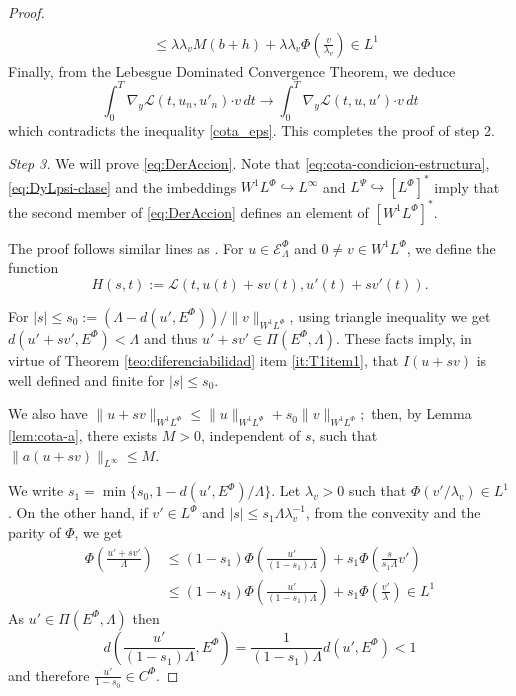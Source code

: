 \documentclass[twoside]{article}
\theoremstyle{remark}
\newcommand{\linf}{\|_{L^{\infty}}}
\newcommand{\lphi}{L^{\Phi}}
\newcommand{\lpsi}{L^{\Psi}}
\newcommand{\ephi}{E^{\Phi}}
\newcommand{\wphi}{W^{1}\lphi}
\newcommand{\sobnor}{\|_{W^{1}\lphi}}
\newcommand{\domi}{\mathcal{E}^{\Phi}}
\renewcommand{\b}[1]{\boldsymbol{#1}}
\newcommand{\ccdot}{\b{\cdot}}
\renewcommand{\leq}{\leqslant}
\begin{document}
\begin{proof}
\begin{equation}
\begin{split}
\\
&\leq \lambda\lambda_v M (b+h)+\lambda\lambda_v  \Phi\left(\frac{v}{\lambda_v}\right)\in L^1
\end{split}
\end{equation}
  Finally, from the Lebesgue Dominated Convergence Theorem, we deduce
\begin{equation}\label{conv_debil}
\int_0^T  \nabla_y\mathcal{L}(t,u_{n},u'_{n})
\ccdot  v \,dt 
\to 
\int_0^T \nabla_y\mathcal{L}(t,u,u')\ccdot v\, dt \end{equation}
which contradicts the inequality \eqref{cota_eps}. This completes the proof of step 2.

\emph{Step 3.} We will prove \eqref{eq:DerAccion}. 
 Note that \eqref{eq:cota-condicion-estructura},  \eqref{eq:DyLpsi-clase} and the imbeddings $\wphi \hookrightarrow L^{\infty}$ and  
$\lpsi\hookrightarrow  \left[\lphi\right]^*$ imply that the second member of
\eqref{eq:DerAccion} defines an element of $\left[\wphi\right]^*$.

The proof follows similar lines as \cite[Thm. 1.4]{mawhin2010critical}. 
For $u\in \domi_{\Lambda}$ and $0\neq v\in\wphi$, we define the function
\[H(s,t):=\mathcal{L}(t,u(t)+s v(t),u'(t)+sv'(t)).\]



For  $|s|\leq s_0:=\left(\Lambda-d(u',\ephi)\right)/\|v\sobnor$, 
using triangle inequality we get 
$
d \left(u'+s v', \ephi \right)<\Lambda$ and thus $u'+sv' \in \Pi(\ephi,\Lambda)$. 
These facts imply, in virtue of Theorem \ref{teo:diferenciabilidad} item \ref{it:T1item1}, 
that $I(u+s v)$ is well defined and finite for $|s|\leq s_0$. 

We also have 
$
\|u+sv\sobnor\leq \|u\sobnor+s_0\|v\sobnor;
$
then, by Lemma \ref{lem:cota-a}, there exists $M>0$, independent of $s$, such that 
$\|a(u+sv)\linf\leq M$.

We write $s_1=\min\{s_0,1-d(u',\ephi)/\Lambda\}$. Let $\lambda_v>0$ such that $\Phi(v'/\lambda_v)\in L^1$.
On the other hand, if $v'\in\lphi$ and $|s|\leq s_1 \Lambda\lambda_v^{-1}$,
from the convexity and the parity of $\Phi$, we get
\[
\begin{split}
\Phi\left(\frac{u'+sv'}{\Lambda}\right)&
\leq
(1-s_1)\Phi\left(\frac{u'}{(1-s_1)\Lambda}\right)+s_1 \Phi\left(\frac{s}{s_1\Lambda}v'\right)
\\
&\leq
(1-s_1)\Phi\left(\frac{u'}{(1-s_1)\Lambda}\right)+s_1 \Phi\left(\frac{v'}{\lambda}\right)
\in L^1
\end{split}
\]
As $u'\in\Pi(\ephi,\Lambda)$ then
\[
d\left(\frac{u'}{(1-s_1)\Lambda},E^{\Phi}\right)=\frac{1}{(1-s_1)\Lambda}d(u', E^{\Phi})<1
\]
and therefore $\frac{u'}{1-s_0}\in C^\Phi$.


\end{proof}
\end{document}
